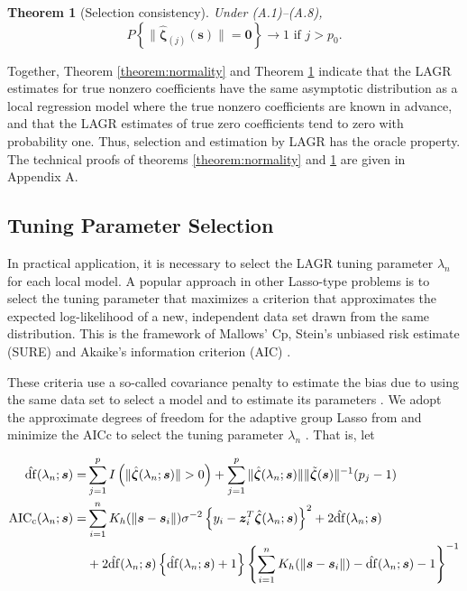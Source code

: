 \documentclass[authoryear,review, 12pt]{elsarticle}
\newtheorem{thm}{Theorem}
\begin{document}
\begin{thm}[Selection consistency]
\label{theorem:selection} Under (A.1)--(A.8), 
\[
P\left\{ \|\hat{\bm{\zeta}}_{(j)}(\bm{s})\|=\bm{0}\right\} \to1\text{ if }j>p_{0}.
\]
\end{thm}
Together, Theorem \ref{theorem:normality} and Theorem \ref{theorem:selection}
indicate that the LAGR estimates for true nonzero coefficients have
the same asymptotic distribution as a local regression model where
the true nonzero coefficients are known in advance, and that the LAGR
estimates of true zero coefficients tend to zero with probability
one. Thus, selection and estimation by LAGR has the oracle property.
The technical proofs of theorems \ref{theorem:normality} and \ref{theorem:selection}
are given in Appendix A.


\subsection{Tuning Parameter Selection}

In practical application, it is necessary to select the LAGR tuning
parameter $\lambda_{n}$ for each local model. A popular approach
in other Lasso-type problems is to select the tuning parameter that
maximizes a criterion that approximates the expected log-likelihood
of a new, independent data set drawn from the same distribution. This
is the framework of Mallows' Cp, Stein's unbiased risk estimate (SURE)
and Akaike's information criterion (AIC) \citep{Mallows-1973,Stein-1981,Akaike-1973}.

These criteria use a so-called covariance penalty to estimate the
bias due to using the same data set to select a model and to estimate
its parameters \citep{Efron:2004a}. We adopt the approximate degrees
of freedom for the adaptive group Lasso from \citet{Yuan-Lin-2006}
and minimize the AICc to select the tuning parameter $\lambda_{n}$
\citep{Hurvich-1998}. That is, let

\begin{align*}
\hat{{\rm df}}(\lambda_{n};\bm{s})= & \sum_{j=1}^{p}I\left(\|\hat{\bm{\zeta}}(\lambda_{n};\bm{s})\|>0\right)+\sum_{j=1}^{p}\|\hat{\bm{\zeta}}(\lambda_{n};\bm{s})\|\|\tilde{\bm{\zeta}}(\bm{s})\|^{-1}(p_{j}-1)\\
\text{AIC}_{{\rm c}}(\lambda_{n};\bm{s})= & \sum_{i=1}^{n}K_{h}(\|\bm{s}-\bm{s}_{i}\|)\sigma^{-2}\left\{ y_{i}-\bm{z}_{i}^{T}\hat{\bm{\zeta}}(\lambda_{n};\bm{s})\right\} ^{2}+2\hat{{\rm df}}(\lambda_{n};\bm{s})\\
 & +2\hat{{\rm df}}(\lambda_{n};\bm{s})\left\{ \hat{{\rm df}}(\lambda_{n};\bm{s})+1\right\} \left\{ \sum_{i=1}^{n}K_{h}(\|\bm{s}-\bm{s}_{i}\|)-\hat{{\rm df}}(\lambda_{n};\bm{s})-1\right\} ^{-1}
\end{align*}
\end{document}
